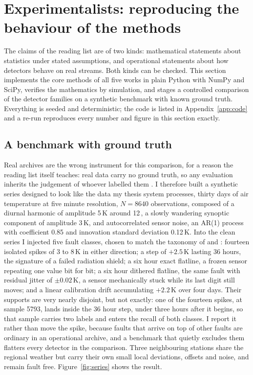 \section{Experimentalists: reproducing the behaviour of the methods}
\label{sec:experimentalists}

The claims of the reading list are of two kinds: mathematical statements
about statistics under stated assumptions, and operational statements about
how detectors behave on real streams. Both kinds can be checked. This section
implements the core methods of all five works in plain Python with NumPy and
SciPy, verifies the mathematics by simulation, and stages a controlled
comparison of the detector families on a synthetic benchmark with known
ground truth. Everything is seeded and deterministic; the code is listed in
Appendix~\ref{app:code} and a re-run reproduces every number and figure in
this section exactly.

\subsection{A benchmark with ground truth}
\label{sec:exp-benchmark}

Real archives are the wrong instrument for this comparison, for a reason the
reading list itself teaches: real data carry no ground truth, so any
evaluation inherits the judgement of whoever labelled them
\citep{leigh2019}. I therefore built a synthetic series designed to look like
the data my thesis system processes, thirty days of air temperature at five
minute resolution, $N = 8640$ observations, composed of a diurnal harmonic of
amplitude 5\,K around 12\,\textcelsius, a slowly wandering synoptic component
of amplitude 3\,K, and autocorrelated sensor noise, an AR(1) process with
coefficient 0.85 and innovation standard deviation 0.12\,K. Into the clean
series I injected five fault classes, chosen to match the taxonomy of
\citet{campbell2013} and \citet{leigh2019}: fourteen isolated
spikes of 3 to 8\,K in either direction; a step of $+2.5$\,K lasting 36
hours, the signature of a failed radiation shield; a six hour exact flatline,
a frozen sensor repeating one value bit for bit; a six hour dithered
flatline, the same fault with residual jitter of $\pm 0.02$\,K, a sensor
mechanically stuck while its last digit still moves; and a linear calibration
drift accumulating $+2.2$\,K over four days. Their supports are very nearly
disjoint, but not exactly: one of the fourteen spikes, at sample 5793, lands
inside the 36 hour step, under three hours after it begins, so that sample
carries two labels and enters the recall of both classes. I report it rather
than move the spike, because faults that arrive on top of other faults are
ordinary in an operational archive, and a benchmark that quietly excludes
them flatters every detector in the comparison. Three neighbouring stations
share the regional weather but carry their own small local deviations,
offsets and noise, and remain fault free. Figure~\ref{fig:series} shows the
result.

